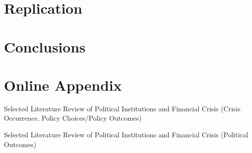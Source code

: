 \documentclass[]{article}
\begin{document}
\section{Replication}\label{replication}

\section{Conclusions}\label{conclusions}





\clearpage

\section*{Online Appendix}


\begin{table}[H]
\caption{Selected Literature Review of Political Institutions and Financial
Crisis (Crisis Occurrence, Policy Choices/Policy Outcomes)}


\label{LitRevTable}
\begin{center}

\vspace{0.5cm}
{\tiny{

}}
\end{center}
\end{table}


\begin{table}
\caption{Selected Literature Review of Political Institutions and Financial
Crisis (Political Outcomes)}


\label{LitRevTable2}
\begin{center}

\vspace{0.5cm}
\scalebox{0.9}{

}
\end{center}
\end{table}
\end{document}
